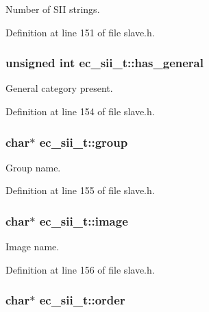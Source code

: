 Number of S\-I\-I strings. 



Definition at line 151 of file slave.\-h.

\subsubsection[{has\-\_\-general}]{\setlength{\rightskip}{0pt plus 5cm}unsigned int ec\-\_\-sii\-\_\-t\-::has\-\_\-general}\label{structec__sii__t_ac9a082bcb14f1d40aa7a2ee278a4a912}


General category present. 



Definition at line 154 of file slave.\-h.

\subsubsection[{group}]{\setlength{\rightskip}{0pt plus 5cm}char$\ast$ ec\-\_\-sii\-\_\-t\-::group}\label{structec__sii__t_a0ac2c5757ef583a6b3e8a8c0ddffbd9f}


Group name. 



Definition at line 155 of file slave.\-h.

\subsubsection[{image}]{\setlength{\rightskip}{0pt plus 5cm}char$\ast$ ec\-\_\-sii\-\_\-t\-::image}\label{structec__sii__t_a505df193133b999f2c073260648b5359}


Image name. 



Definition at line 156 of file slave.\-h.

\subsubsection[{order}]{\setlength{\rightskip}{0pt plus 5cm}char$\ast$ ec\-\_\-sii\-\_\-t\-::order}\label{structec__sii__t_a26e505154880d387b75d4d9f52181223}


